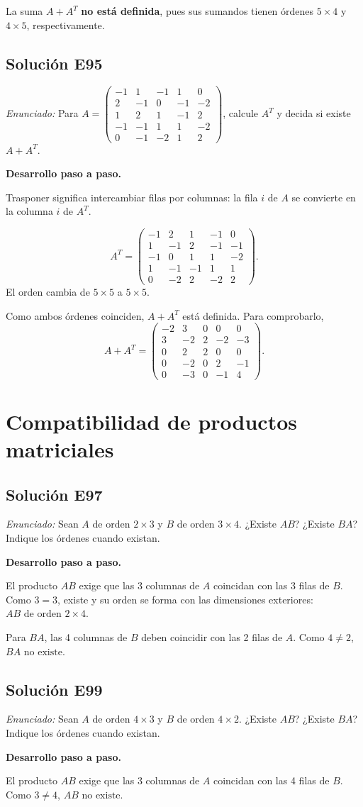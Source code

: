 \documentclass[12pt]{article}
\theoremstyle{remark}
\newcommand{\solucion}[2]{\Needspace{11\baselineskip}\subsection*{Solución E#1}\noindent\textit{Enunciado:} #2\par\medskip\noindent\textbf{Desarrollo paso a paso.}\par\medskip}
\begin{document}
La suma $A+A^T$ \textbf{no está definida}, pues sus sumandos tienen órdenes $5\times4$ y $4\times5$, respectivamente.


\medskip

\solucion{95}{Para $A=\begin{pmatrix}-1&1&-1&1&0\\2&-1&0&-1&-2\\1&2&1&-1&2\\-1&-1&1&1&-2\\0&-1&-2&1&2\end{pmatrix}$, calcule $A^T$ y decida si existe $A+A^T$.}
Trasponer significa intercambiar filas por columnas: la fila $i$ de $A$ se convierte en la columna $i$ de $A^T$.

\[
A^T=\begin{pmatrix}-1&2&1&-1&0\\1&-1&2&-1&-1\\-1&0&1&1&-2\\1&-1&-1&1&1\\0&-2&2&-2&2\end{pmatrix}.
\]
El orden cambia de $5\times5$ a $5\times5$.

Como ambos órdenes coinciden, $A+A^T$ está definida. Para comprobarlo,
\[
A+A^T=\begin{pmatrix}-2&3&0&0&0\\3&-2&2&-2&-3\\0&2&2&0&0\\0&-2&0&2&-1\\0&-3&0&-1&4\end{pmatrix}.
\]

\medskip

\section{Compatibilidad de productos matriciales}

\solucion{97}{Sean $A$ de orden $2\times3$ y $B$ de orden $3\times4$. ¿Existe $AB$? ¿Existe $BA$? Indique los órdenes cuando existan.}
El producto $AB$ exige que las 3 columnas de $A$ coincidan con las 3 filas de $B$. Como $3=3$, existe y su orden se forma con las dimensiones exteriores: $\boxed{AB\text{ de orden } 2\times 4}$.

Para $BA$, las 4 columnas de $B$ deben coincidir con las 2 filas de $A$. Como $4\neq2$, $\boxed{BA\text{ no existe}}$.


\medskip

\solucion{99}{Sean $A$ de orden $4\times3$ y $B$ de orden $4\times2$. ¿Existe $AB$? ¿Existe $BA$? Indique los órdenes cuando existan.}
El producto $AB$ exige que las 3 columnas de $A$ coincidan con las 4 filas de $B$. Como $3\neq4$, $\boxed{AB\text{ no existe}}$.
\end{document}
